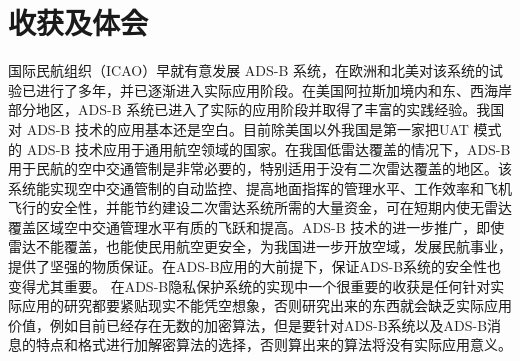 \section{收获及体会}
国际民航组织（ICAO）早就有意发展 ADS-B 系统，在欧洲和北美对该系统的试验已进行了多年，并已逐渐进入实际应用阶段。在美国阿拉斯加境内和东、西海岸部分地区，ADS-B 系统已进入了实际的应用阶段并取得了丰富的实践经验。我国对 ADS-B 技术的应用基本还是空白。目前除美国以外我国是第一家把UAT 模式的 ADS-B 技术应用于通用航空领域的国家。在我国低雷达覆盖的情况下，ADS-B 用于民航的空中交通管制是非常必要的，特别适用于没有二次雷达覆盖的地区。该系统能实现空中交通管制的自动监控、提高地面指挥的管理水平、工作效率和飞机飞行的安全性，并能节约建设二次雷达系统所需的大量资金，可在短期内使无雷达覆盖区域空中交通管理水平有质的飞跃和提高。ADS-B 技术的进一步推广，即使雷达不能覆盖，也能使民用航空更安全，为我国进一步开放空域，发展民航事业，提供了坚强的物质保证。在ADS-B应用的大前提下，保证ADS-B系统的安全性也变得尤其重要。
在ADS-B隐私保护系统的实现中一个很重要的收获是任何针对实际应用的研究都要紧贴现实不能凭空想象，否则研究出来的东西就会缺乏实际应用价值，例如目前已经存在无数的加密算法，但是要针对ADS-B系统以及ADS-B消息的特点和格式进行加解密算法的选择，否则算出来的算法将没有实际应用意义。



